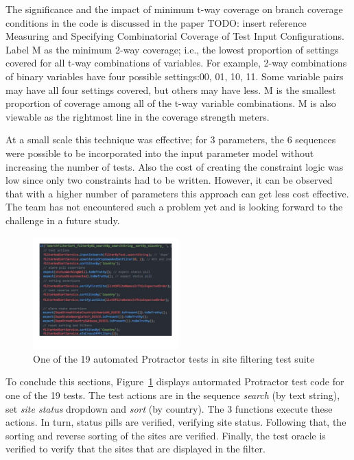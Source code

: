 \documentclass[conference]{IEEEtran}
\newcommand{\todo}[1]{}
\renewcommand{\todo}[1]{{\color{red} TODO: {#1}}}
\begin{document}
	The significance and the impact of minimum t-way coverage on branch coverage conditions in the code is discussed in the paper \todo{insert reference} Measuring and Specifying Combinatorial Coverage of Test Input Configurations.
	Label M as the minimum 2-way coverage; i.e., the lowest proportion of settings covered for all t-way combinations of variables.
	For example, 2-way combinations of binary variables have four possible settings:00, 01, 10, 11.
	Some variable pairs may have all four settings covered, but others may have less.
	M is the smallest proportion of coverage among all of the t-way variable combinations.
	M is also viewable as the rightmost line in the coverage strength meters.

	At a small scale this technique was effective; for 3 parameters, the 6 sequences were possible to be incorporated into the input parameter model without increasing the number of tests. 
	Also the cost of creating the constraint logic was low since only two constraints had to be written.
	However, it can be observed that with a higher number of parameters this approach can get less cost effective. 
	The team has not encountered such a problem yet and is looking forward to the challenge in a future study.
	
	\begin{figure}[!h]
		\includegraphics[width=0.50\textwidth,]{sortingTestCode.pdf}
		\caption{One of the 19 automated Protractor tests in site filtering test suite}
		\label{fig:sortingTestCode}
	\end{figure}

	To conclude this sections, Figure~\ref{fig:sortingTestCode} displays autormated Protractor test code for one of the 19 tests.
	The test actions are in the sequence \textit{search} (by text string), set \textit{site status} dropdown and \textit{sort} (by country). 
	The 3 functions execute these actions.
	In turn, status pills are verified, verifying site status.
	Following that, the sorting and reverse sorting of the sites are verified.
	Finally, the test oracle is verified to verify that the sites that are displayed in the filter.
		
\end{document}
